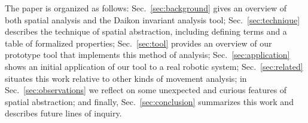 The paper is organized as follows:
Sec.~\ref{sec:background} gives an overview of both spatial analysis and the Daikon invariant analysis tool;
Sec.~\ref{sec:technique} describes the technique of spatial abstraction, including defining terms and a table of formalized properties;
Sec.~\ref{sec:tool} provides an overview of our prototype tool that implements this method of analysis;
Sec.~\ref{sec:application} shows an initial application of our tool to a real robotic system;
Sec.~\ref{sec:related} situates this work relative to other kinds of movement analysis;
in Sec.~\ref{sec:observations} we reflect on some unexpected and curious features of spatial abstraction;
and finally, Sec.~\ref{sec:conclusion} summarizes this work and describes future lines of inquiry. 




